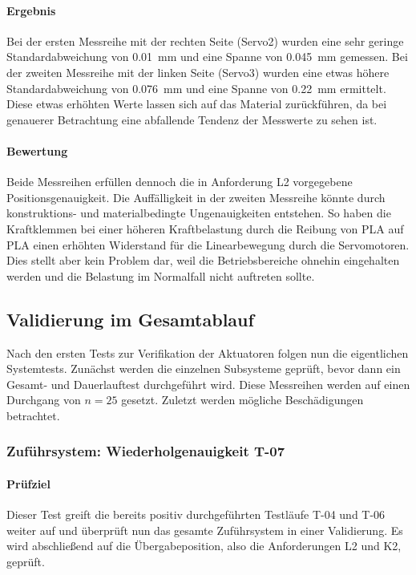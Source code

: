 \paragraph{Ergebnis}
Bei der ersten Messreihe mit der rechten Seite (Servo2) wurden eine sehr geringe Standardabweichung von \qty{0.01}{\milli\meter} und eine
Spanne von \qty{0.045}{\milli\meter} gemessen. Bei der zweiten Messreihe mit der linken Seite (Servo3) wurden eine etwas höhere
Standardabweichung von \qty{0.076}{\milli\meter} und eine Spanne von \qty{0.22}{\milli\meter} ermittelt. Diese etwas erhöhten Werte lassen
sich auf das Material zurückführen, da bei genauerer Betrachtung eine abfallende Tendenz der Messwerte zu sehen ist.

\paragraph{Bewertung}
Beide Messreihen erfüllen dennoch die in Anforderung L2 vorgegebene Positionsgenauigkeit. Die Auffälligkeit in der zweiten Messreihe
könnte durch konstruktions- und materialbedingte Ungenauigkeiten entstehen. So haben die Kraftklemmen bei einer höheren Kraftbelastung
durch die Reibung von PLA auf PLA einen erhöhten Widerstand für die Linearbewegung durch die Servomotoren. Dies stellt aber kein Problem
dar, weil die Betriebsbereiche ohnehin eingehalten werden und die Belastung im Normalfall nicht auftreten sollte.

\subsection{Validierung im Gesamtablauf}\label{sec:Systemtest}
Nach den ersten Tests zur Verifikation der Aktuatoren folgen nun die eigentlichen Systemtests. Zunächst werden die einzelnen Subsysteme
geprüft, bevor dann ein Gesamt- und Dauerlauftest durchgeführt wird. Diese Messreihen werden auf einen Durchgang von $n = 25$ gesetzt.
Zuletzt werden mögliche Beschädigungen betrachtet.

\subsubsection{Zuführsystem: Wiederholgenauigkeit T-07}\label{sec:VR_Wiederholgenauigkeit}

\paragraph{Prüfziel}
Dieser Test greift die bereits positiv durchgeführten Testläufe T-04 und T-06 weiter auf und überprüft nun das gesamte Zuführsystem
in einer Validierung. Es wird abschließend auf die Übergabeposition, also die Anforderungen L2 und K2, geprüft.

